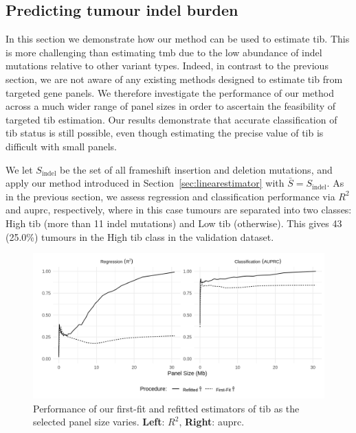 \documentclass[10pt,twoside,openright]{report}
\begin{document}


\subsection{Predicting tumour indel burden \label{sec:indel}}
In this section we demonstrate how our method can be used to estimate \acrshort{tib}. 
This is more challenging than estimating \acrshort{tmb} due to the low abundance of indel mutations relative to other variant types. Indeed, in contrast to the previous section, we are not aware of any existing methods designed to estimate \acrshort{tib} from targeted gene panels. We therefore investigate the performance of our method across a much wider range of panel sizes in order to ascertain the feasibility of targeted \acrshort{tib} estimation. Our results demonstrate that accurate classification of \acrshort{tib} status is still possible, even though estimating the precise value of \acrshort{tib} is difficult with small panels.  

We let $S_{\text{indel}}$ be the set of all frameshift insertion and deletion mutations, and apply our method introduced in Section~\ref{sec:linearestimator} with $\bar{S} = S_{\text{indel}}$. As in the previous section, we assess regression and classification performance via $R^2$ and \acrshort{auprc}, respectively, where in this case tumours are separated into two classes: High \acrshort{tib} (more than 11 indel mutations) and Low \acrshort{tib} (otherwise). This gives 43 (25.0\%) tumours in the High \acrshort{tib} class in the validation dataset. 

\begin{figure}[htbp]
\centering
\includegraphics[width=6in]{indel_panel_stats.png}
\vspace*{-5mm}
\caption{Performance of our first-fit and refitted estimators of \acrshort{tib} as the selected panel size varies. \textbf{Left}: $R^2$, \textbf{Right}: \acrshort{auprc}. \label{fig:indelstatsplot}}
\vspace*{-2mm}
\end{figure}
\end{document}
